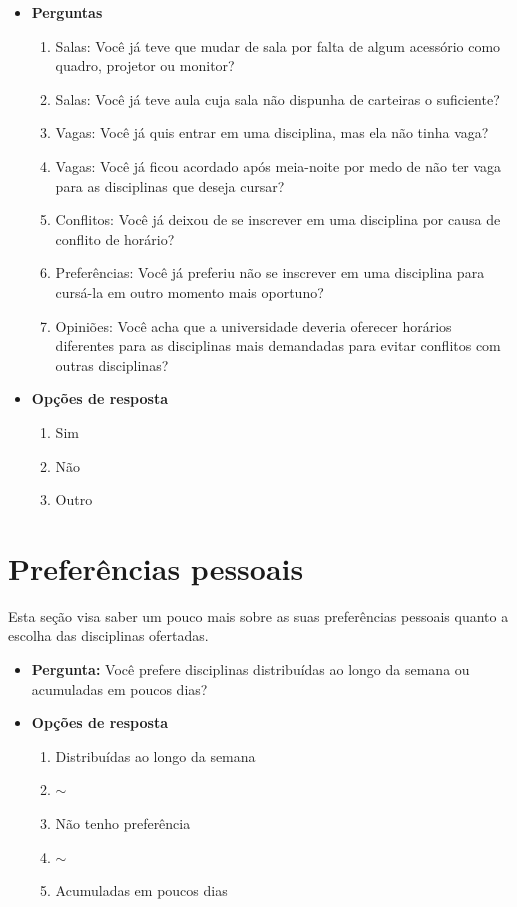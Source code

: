 \begin{apendicesenv}
  \begin{itemize}
    \item \textbf{Perguntas}
          \begin{enumerate}
            \item Salas: Você já teve que mudar de sala por falta de algum acessório como quadro, projetor ou monitor?
            \item Salas: Você já teve aula cuja sala não dispunha de carteiras o suficiente?
            \item Vagas: Você já quis entrar em uma disciplina, mas ela não tinha vaga?
            \item Vagas: Você já ficou acordado após meia-noite por medo de não ter vaga para as disciplinas que deseja cursar?
            \item Conflitos: Você já deixou de se inscrever em uma disciplina por causa de conflito de horário?
            \item Preferências: Você já preferiu não se inscrever em uma disciplina para cursá-la em outro momento mais oportuno?
            \item Opiniões: Você acha que a universidade deveria oferecer horários diferentes para as disciplinas mais demandadas para evitar conflitos com outras disciplinas?
          \end{enumerate}
    \item \textbf{Opções de resposta}
          \begin{enumerate}
            \item Sim
            \item Não
            \item Outro
          \end{enumerate}
  \end{itemize}

  \section*{Preferências pessoais}

  Esta seção visa saber um pouco mais sobre as suas preferências pessoais quanto a escolha das disciplinas ofertadas.

  \begin{itemize}
    \item \textbf{Pergunta:} Você prefere disciplinas distribuídas ao longo da semana ou acumuladas em poucos dias?
    \item \textbf{Opções de resposta}
          \begin{enumerate}
            \item Distribuídas ao longo da semana
            \item $\sim$
            \item Não tenho preferência
            \item $\sim$
            \item Acumuladas em poucos dias
          \end{enumerate}
  \end{itemize}


\end{apendicesenv}
